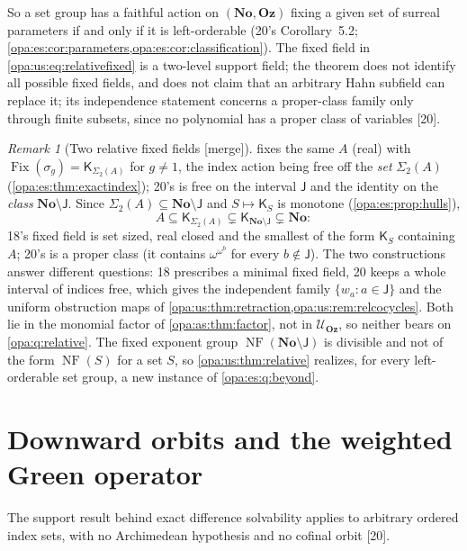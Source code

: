 \documentclass[11pt,oneside]{article}
\numberwithin{equation}{section}
\theoremstyle{definition}
\theoremstyle{remark}
\newtheorem{remark}[remark]{Remark}
\newcommand{\No}{\mathbf{No}}
\newcommand{\Oz}{\mathbf{Oz}}
\newcommand{\UU}{\mathcal U}
\newcommand{\Fix}{\operatorname{Fix}}
\newcommand{\src}[1]{\textup{\textsf{\small[#1]}}}
\newcommand{\mergetag}{\textup{\textsf{\small[merge]}}}
\newcommand{\NF}{\operatorname{NF}}
\begin{document}
So a set group has a faithful action on $(\No,\Oz)$ fixing a given set of surreal parameters if and only if it is left-orderable (20's
Corollary~5.2; \cref{opa:es:cor:parameters,opa:es:cor:classification}). The fixed field in \eqref{opa:us:eq:relativefixed} is a two-level
support field; the theorem does not identify all possible fixed fields, and does not claim that an arbitrary Hahn subfield can replace it;
its independence statement concerns a proper-class family only through finite subsets, since no polynomial has a proper class of
variables \src{20}.

\begin{remark}[Two relative fixed fields \mergetag]\label{opa:us:rem:twofields}
 fixes the same $A$ (real) with $\Fix(\sigma_g)=\mathsf K_{\Sigma_2(A)}$ for $g\ne1$, the index action being free off the
\emph{set} $\Sigma_2(A)$ (\cref{opa:es:thm:exactindex}); 20's is free on the interval $\mathsf J$ and the identity on the \emph{class}
$\No\setminus\mathsf J$. Since $\Sigma_2(A)\subseteq\No\setminus\mathsf J$ and $S\mapsto\mathsf K_S$ is monotone (\cref{opa:es:prop:hulls}),
\[
 A\subseteq\mathsf K_{\Sigma_2(A)}\subsetneq\mathsf K_{\No\setminus\mathsf J}\subsetneq\No:
\]
18's fixed field is set sized, real closed and the smallest of the form $\mathsf K_S$ containing $A$; 20's is a proper class (it contains
$\omega^{\omega^b}$ for every $b\notin\mathsf J$). The two constructions answer different questions: 18 prescribes a minimal fixed field, 20
keeps a whole interval of indices free, which gives the independent family $\{w_a:a\in\mathsf J\}$ and the uniform obstruction maps of
\cref{opa:us:thm:retraction,opa:us:rem:relcocycles}. Both lie in the monomial factor of \cref{opa:as:thm:factor}, not in $\UU_\Oz$, so neither
bears on \cref{opa:q:relative}. The fixed exponent group $\NF(\No\setminus\mathsf J)$ is divisible and not of the form $\NF(S)$ for a set $S$, so
\cref{opa:us:thm:relative} realizes, for every left-orderable set group, a new instance of \cref{opa:es:q:beyond}.
\end{remark}

\section{Downward orbits and the weighted Green operator}\label{opa:us:sec:green}

The support result behind exact difference solvability applies to arbitrary ordered index sets, with no Archimedean hypothesis and no cofinal
orbit \src{20}.
\end{document}
